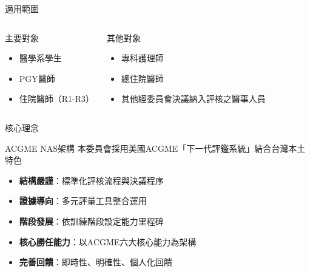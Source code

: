 \documentclass[aspectratio=169,12pt]{beamer}
\begin{document}
\begin{frame}{適用範圍}
\begin{columns}[T]
\begin{block}{主要對象}
\begin{itemize}
    \item 醫學系學生
    \item PGY醫師
    \item 住院醫師（R1-R3）
\end{itemize}
\end{block}

\begin{block}{其他對象}
\begin{itemize}
    \item 專科護理師
    \item 總住院醫師
    \item 其他經委員會決議納入評核之醫事人員
\end{itemize}
\end{block}
\end{columns}
\end{frame}

\begin{frame}{核心理念}
\begin{block}{ACGME NAS架構}
本委員會採用美國ACGME「下一代評鑑系統」結合台灣本土特色
\end{block}

\begin{itemize}
    \item \textbf{結構嚴謹}：標準化評核流程與決議程序
    \item \textbf{證據導向}：多元評量工具整合運用
    \item \textbf{階段發展}：依訓練階段設定能力里程碑
    \item \textbf{核心勝任能力}：以ACGME六大核心能力為架構
    \item \textbf{完善回饋}：即時性、明確性、個人化回饋
\end{itemize}
\end{frame}
\end{document}
